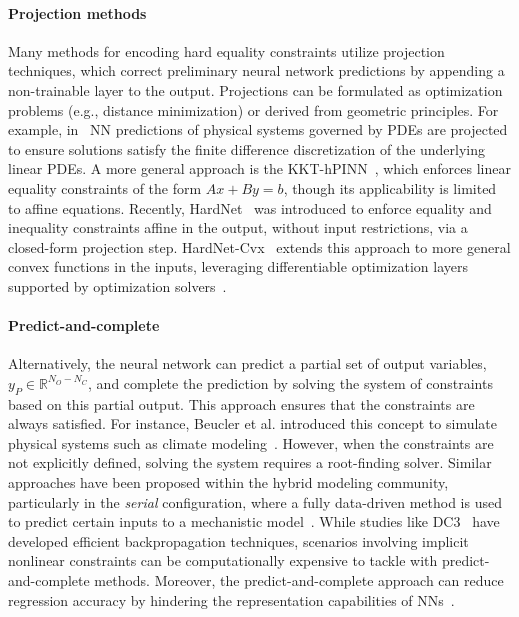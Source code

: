 \paragraph{Projection methods}
Many methods for encoding hard equality constraints utilize projection techniques, which correct preliminary neural network predictions by appending a non-trainable layer to the output. Projections can be formulated as optimization problems (e.g., distance minimization) or derived from geometric principles. For example, in~\cite{Chen2021_Theoryguidedhard} NN predictions of physical systems governed by PDEs are projected to ensure solutions satisfy the finite difference discretization of the underlying linear PDEs. A more general approach is the KKT-hPINN~\cite{Chen2024_PhysicsInformedNeural}, which enforces linear equality constraints of the form $Ax+By=b$, though its applicability is limited to affine equations. Recently, HardNet~\cite{Min2024_HardConstrainedNeural} was introduced to enforce equality and inequality constraints affine in the output, without input restrictions, via a closed-form projection step. HardNet-Cvx~\cite{Min2024_HardConstrainedNeural} extends this approach to more general convex functions in the inputs, leveraging differentiable optimization layers supported by optimization solvers~\cite{Agrawal2019_DifferentiableConvexOptimization}.

\paragraph{Predict-and-complete}
Alternatively, the neural network can predict a partial set of output variables, $y_P \in \mathbb{R}^{N_O - N_C}$, and complete the prediction by solving the system of constraints based on this partial output. This approach ensures that the constraints are always satisfied. For instance, Beucler et al. introduced this concept to simulate physical systems such as climate modeling~\cite{Beucler2019_EnforcingAnalyticConstraints}. However, when the constraints are not explicitly defined, solving the system requires a root-finding solver. Similar approaches have been proposed within the hybrid modeling community, particularly in the \textit{serial} configuration, where a fully data-driven method is used to predict certain inputs to a mechanistic model~\cite{Schweidtmann2024_reviewperspectivehybrida}. While studies like DC3~\cite{Donti2021_DC3learningmethod} have developed efficient backpropagation techniques, scenarios involving implicit nonlinear constraints can be computationally expensive to tackle with predict-and-complete methods. Moreover, the predict-and-complete approach can reduce regression accuracy by hindering the representation capabilities of NNs~\cite{Beucler2019_EnforcingAnalyticConstraints}.


